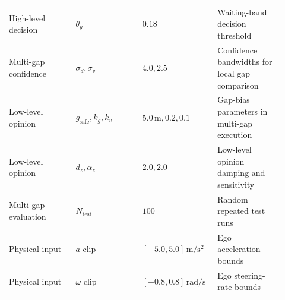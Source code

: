 \begin{uomappendix}
{\begin{supertabular}{L{0.23\linewidth}L{0.23\linewidth}L{0.23\linewidth}L{0.23\linewidth}}
High-level decision & \(\theta_y\) & \(0.18\) & Waiting-band decision threshold \\
Multi-gap confidence & \(\sigma_d,\sigma_v\) & \(4.0,2.5\) & Confidence bandwidths for local gap comparison \\
Low-level opinion & \(g_{\mathrm{safe}},k_g,k_v\) & \(5.0\,\mathrm{m},0.2,0.1\) & Gap-bias parameters in multi-gap execution \\
Low-level opinion & \(d_z,\alpha_z\) & \(2.0,2.0\) & Low-level opinion damping and sensitivity \\
Multi-gap evaluation & \(N_{\mathrm{test}}\) & \(100\) & Random repeated test runs \\
Physical input & \(a\) clip & \([-5.0,5.0]\,\mathrm{m / s^2}\) & Ego acceleration bounds \\
Physical input & \(\omega\) clip & \([-0.8,0.8]\,\mathrm{rad / s}\) & Ego steering-rate bounds \\
\bottomrule
\end{supertabular}
}

\end{uomappendix}



